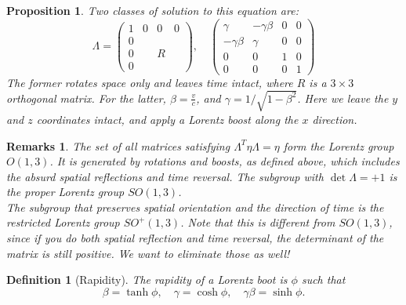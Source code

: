\documentclass[a4paper]{article}
\newtheorem{remarks}{Remarks}[section]
\theoremstyle{new}
\newtheorem{defi}{Definition}[section]
\newtheorem{prop}{Proposition}[section]
\begin{document}
\begin{prop}
Two classes of solution to this equation are:
$$\Lambda =
  \begin{pmatrix}
    1 & 0 & 0 & 0\\
    0\\
    0 & & R\\
    0
  \end{pmatrix},\quad \begin{pmatrix}
    \gamma & -\gamma \beta & 0 & 0\\
    -\gamma\beta & \gamma & 0 & 0\\
    0 & 0 & 1 & 0\\
    0 & 0 & 0 & 1
  \end{pmatrix}$$
The former rotates space only and leaves time intact, where $R$ is a $3\times 3$ orthogonal matrix. For the latter, $\beta = \frac{v}{c}$, and $\gamma = 1/\sqrt{1 - \beta^2}$. Here we leave the $y$ and $z$ coordinates intact, and apply a Lorentz boost along the $x$ direction.
\end{prop}
\begin{remarks}
The set of all matrices satisfying $\Lambda^T\eta\Lambda=\eta$ form the Lorentz group $O(1, 3)$. It is generated by rotations and boosts, as defined above, which includes the absurd spatial reflections and time reversal. The subgroup with $\det \Lambda = +1$ is the proper Lorentz group $SO(1, 3)$.\\[5pt]
The subgroup that preserves spatial orientation and the direction of time is the restricted Lorentz group $SO^+(1, 3)$. Note that this is different from $SO(1, 3)$, since if you do both spatial reflection and time reversal, the determinant of the matrix is still positive. We want to eliminate those as well!
\end{remarks}
\begin{defi}[Rapidity]
  The \emph{rapidity} of a Lorentz boot is $\phi$ such that
  \[
    \beta = \tanh \phi,\quad \gamma = \cosh\phi,\quad \gamma\beta=\sinh \phi.
  \]
\end{defi}
\end{document}
